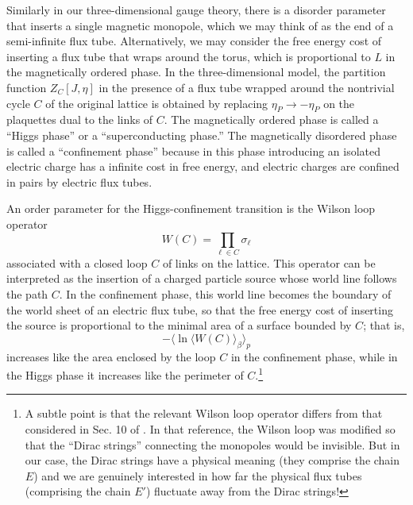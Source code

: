 Similarly in our three-dimensional gauge theory, there is a disorder parameter that
inserts a single magnetic monopole, which we may think of as the end of a
semi-infinite flux tube.  Alternatively, we may consider the free energy cost of inserting a flux tube that wraps around the torus, which is proportional to $L$ in the magnetically ordered phase. In the three-dimensional model, the partition function $Z_C [J,\eta]$ in the presence of a flux tube wrapped around the nontrivial cycle $C$ of the original lattice is obtained by replacing $\eta_P \rightarrow - \eta_P$ on the plaquettes dual to
the links of $C$. The magnetically ordered phase is called a ``Higgs
phase'' or a ``superconducting phase.''  The magnetically disordered
phase is called a ``confinement phase'' because in this phase
introducing an isolated electric charge has a infinite cost in free energy, and
electric charges are confined in pairs by electric flux tubes. 

An order parameter for the Higgs-confinement transition is the Wilson loop operator
\begin{equation}
W(C)=\prod_{\ell\in C} \sigma_\ell
\end{equation}
associated with a closed loop $C$ of links on the lattice. This operator can be interpreted as the insertion of a charged particle source whose world line follows the path $C$. In the confinement phase, this world line becomes the boundary of the world sheet of an electric flux tube, so that the free energy cost of inserting the source is proportional to the minimal area of a surface bounded by $C$; that is, 
\begin{equation}
-\langle\ln \langle W(C)\rangle_\beta\rangle_p
\end{equation}
increases like the area enclosed by the loop $C$ in the confinement phase, while in the Higgs phase it increases like the perimeter of $C$.\footnote{A subtle point is that the relevant Wilson loop operator differs from that considered in Sec. 10 of \cite{alford}. In that reference, the Wilson loop was modified so that the ``Dirac strings'' connecting the monopoles would be invisible. But in our case, the Dirac strings have a physical meaning (they comprise the chain $E$) and we are genuinely interested in how far the physical flux tubes (comprising the chain $E'$) fluctuate away from the Dirac strings!}

